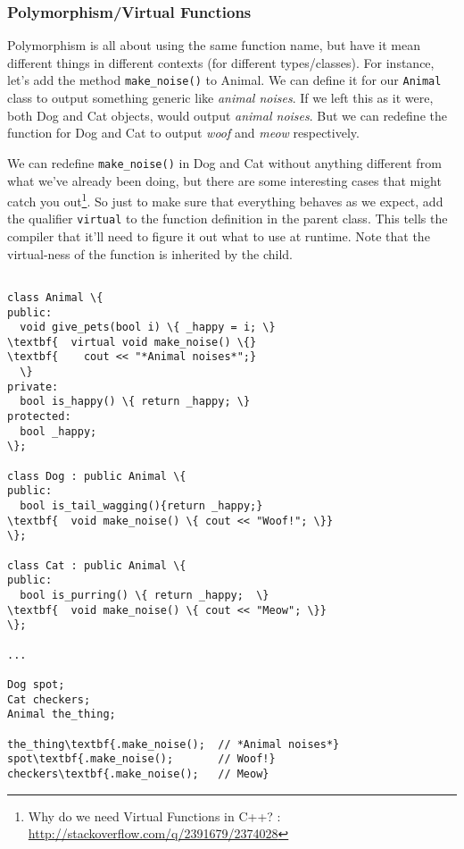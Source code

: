 \documentclass{IEEEtran}
\begin{document}
\subsubsection{Polymorphism/Virtual Functions}

Polymorphism is all about using the same function name, but have it mean different things in different contexts (for different types/classes). For instance, let's add the method \verb|make_noise()| to Animal. We can define it for our \verb|Animal| class to output something generic like \textit{animal noises}. If we left this as it were, both Dog and Cat objects, would output \textit{animal noises}. But we can redefine the function for Dog and Cat to output \textit{woof} and \textit{meow} respectively.

We can redefine \verb|make_noise()| in Dog and Cat without anything different from what we've already been doing, but there are some interesting cases that might catch you out\footnote{Why do we need Virtual Functions in C++?
: \url{http://stackoverflow.com/q/2391679/2374028}}. So just to make sure that everything behaves as we expect, add the qualifier \verb|virtual| to the function definition in the parent class. This tells the compiler that it'll need to figure it out what to use at runtime. Note that the virtual-ness of the function is inherited by the child.


\begin{Verbatim}[fontsize=\scriptsize, xleftmargin=.3in, commandchars=\\\{\}]

class Animal \{
public:
  void give_pets(bool i) \{ _happy = i; \}
\textbf{  virtual void make_noise() \{} 
\textbf{    cout << "*Animal noises*";}
  \}
private:
  bool is_happy() \{ return _happy; \}
protected:
  bool _happy;
\};

class Dog : public Animal \{
public:
  bool is_tail_wagging(){return _happy;}
\textbf{  void make_noise() \{ cout << "Woof!"; \}}
\};

class Cat : public Animal \{
public:
  bool is_purring() \{ return _happy;  \}
\textbf{  void make_noise() \{ cout << "Meow"; \}}
\};

...

Dog spot;
Cat checkers;
Animal the_thing;

the_thing\textbf{.make_noise();  // *Animal noises*}
spot\textbf{.make_noise();       // Woof!}
checkers\textbf{.make_noise();   // Meow}

\end{Verbatim}
\end{document}
